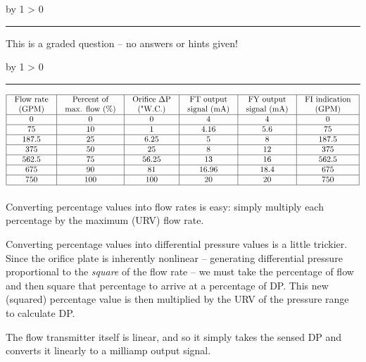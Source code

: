 \documentclass[12pt,a4paper]{article}
\def\svar{
           \advance\answnum by 1
           \ifnum \answnum > 0
                \hrule
                \vskip 3pt
                \leftline{Svar \the\answnum}
                \vskip 3pt \fi}
\def\notes{
           \advance\explnum by 1
           \ifnum \explnum > 0
                \hrule
                \vskip 3pt
                \leftline{Notes \the\explnum}
                \vskip 3pt \fi}
\begin{document}
\vfil

\eject
\vskip 10pt \filbreak 





\svar{} 

This is a graded question -- no answers or hints given!

\vskip 10pt \filbreak 





\notes{} 


$$\vbox{\offinterlineskip
\halign{\strut
\vrule \quad\hfil # \ \hfil & 
\vrule \quad\hfil # \ \hfil & 
\vrule \quad\hfil # \ \hfil & 
\vrule \quad\hfil # \ \hfil & 
\vrule \quad\hfil # \ \hfil & 
\vrule \quad\hfil # \ \hfil \vrule \cr
\noalign{\hrule}
%
Flow rate & Percent of & Orifice $\Delta$P & FT output & FY output & FI indication \cr
%
(GPM) & max. flow (\%) & ("W.C.) & signal (mA) & signal (mA) & (GPM) \cr
%
\noalign{\hrule}
%
0 & 0 & 0 & 4 & 4 & 0 \cr
%
\noalign{\hrule}
%
75  & 10 & 1 & 4.16 & 5.6 & 75 \cr
%
\noalign{\hrule}
%
187.5  & 25 & 6.25 & 5 & 8 & 187.5 \cr
%
\noalign{\hrule}
%
375 & 50 & 25 & 8 & 12 & 375 \cr
%
\noalign{\hrule}
%
562.5 & 75 & 56.25 & 13 & 16 & 562.5 \cr
%
\noalign{\hrule}
%
675 & 90 & 81 & 16.96 & 18.4 & 675 \cr
%
\noalign{\hrule}
%
750 & 100 & 100 & 20 & 20 & 750 \cr
%
\noalign{\hrule}
} %
}$$ %

Converting percentage values into flow rates is easy: simply multiply each percentage by the maximum (URV) flow rate.

\vskip 10pt

Converting percentage values into differential pressure values is a little trickier.  Since the orifice plate is inherently nonlinear -- generating differential pressure proportional to the {\it square} of the flow rate -- we must take the percentage of flow and then square that percentage to arrive at a percentage of DP.  This new (squared) percentage value is then multiplied by the URV of the pressure range to calculate DP.

\vskip 10pt

The flow transmitter itself is linear, and so it simply takes the sensed DP and converts it linearly to a milliamp output signal.
\end{document}
